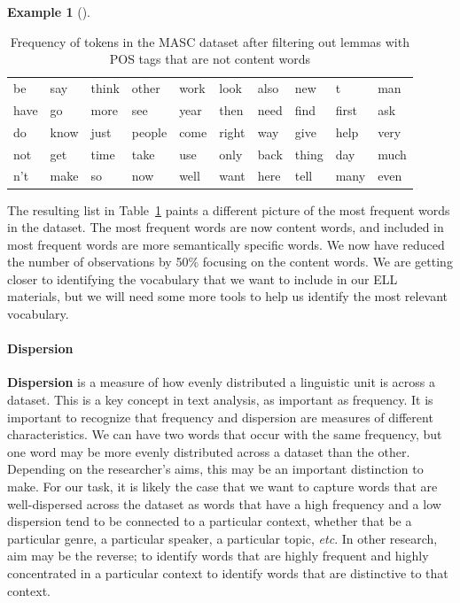 \documentclass[
  letterpaper,
  DIV=11,
  numbers=noendperiod]{scrreprt}
\let\oldparagraph\paragraph
\renewcommand{\paragraph}[1]{\oldparagraph{#1}\mbox{}}
\theoremstyle{definition}
\newtheorem{example}{Example}[chapter]
\theoremstyle{remark}
\begin{document}
\begin{example}[]
\begin{longtable}[]{@{}llllllllll@{}}

\caption{\label{tbl-eda-masc-filter-pos}Frequency of tokens in the MASC
dataset after filtering out lemmas with POS tags that are not content
words}

\tabularnewline

\toprule\noalign{}
\endhead
\bottomrule\noalign{}
\endlastfoot
be & say & think & other & work & look & also & new & t & man \\
have & go & more & see & year & then & need & find & first & ask \\
do & know & just & people & come & right & way & give & help & very \\
not & get & time & take & use & only & back & thing & day & much \\
n't & make & so & now & well & want & here & tell & many & even \\

\end{longtable}

\end{example}

The resulting list in Table~\ref{tbl-eda-masc-filter-pos} paints a
different picture of the most frequent words in the dataset. The most
frequent words are now content words, and included in most frequent
words are more semantically specific words. We now have reduced the
number of observations by 50\% focusing on the content words. We are
getting closer to identifying the vocabulary that we want to include in
our ELL materials, but we will need some more tools to help us identify
the most relevant vocabulary.

\paragraph{Dispersion}\label{sec-eda-frequency-dispersion}

\textbf{Dispersion} is a measure of how evenly distributed a linguistic
unit is across a dataset. This is a key concept in text analysis, as
important as frequency. It is important to recognize that frequency and
dispersion are measures of different characteristics. We can have two
words that occur with the same frequency, but one word may be more
evenly distributed across a dataset than the other. Depending on the
researcher's aims, this may be an important distinction to make. For our
task, it is likely the case that we want to capture words that are
well-dispersed across the dataset as words that have a high frequency
and a low dispersion tend to be connected to a particular context,
whether that be a particular genre, a particular speaker, a particular
topic, \emph{etc}. In other research, aim may be the reverse; to
identify words that are highly frequent and highly concentrated in a
particular context to identify words that are distinctive to that
context.
\end{document}
